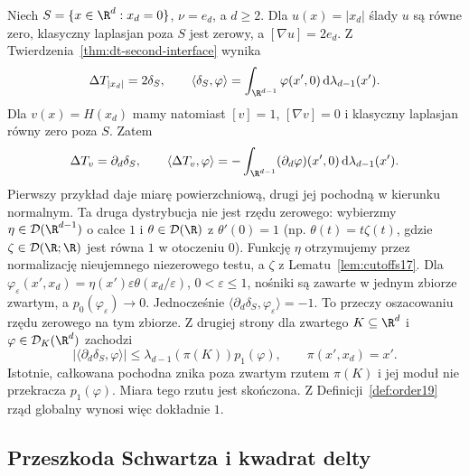 \begin{przyklad}
\label{ex:dt-flat-interface}
Niech $S=\{x\in\R^d:x_d=0\}$, $\nu=e_d$,
a $d\ge2$. Dla $u(x)=|x_d|$ ślady $u$ są równe zero,
klasyczny laplasjan poza $S$ jest zerowy, a
$[\nabla u]=2e_d$. Z Twierdzenia~\ref{thm:dt-second-interface}
wynika
\[
 \Delta T_{|x_d|}=2\delta_S,\qquad
 \langle\delta_S,\varphi\rangle
 =\int_{\R^{d-1}}\varphi(x',0)\,\mathrm d\lambda_{d-1}(x').
\]
Dla $v(x)=H(x_d)$ mamy natomiast $[v]=1$,
$[\nabla v]=0$ i klasyczny laplasjan równy zero poza $S$.
Zatem
\[
 \Delta T_v=\partial_d\delta_S,\qquad
 \langle\Delta T_v,\varphi\rangle
 =-\int_{\R^{d-1}}(\partial_d\varphi)(x',0)\,
 \mathrm d\lambda_{d-1}(x').
\]
Pierwszy przykład daje miarę powierzchniową, drugi
jej pochodną w kierunku normalnym. Ta druga dystrybucja
nie jest rzędu zerowego: wybierzmy
$\eta\in\mathcal D(\R^{d-1})$ o całce $1$ i
$\theta\in\mathcal D(\R)$ z $\theta'(0)=1$
(np. $\theta(t)=t\zeta(t)$, gdzie
$\zeta\in\mathcal D(\R;\R)$ jest równa $1$ w otoczeniu $0$).
Funkcję $\eta$ otrzymujemy przez normalizację nieujemnego
niezerowego testu, a $\zeta$ z Lematu~\ref{lem:cutoffs17}.
Dla $\varphi_\varepsilon(x',x_d)
=\eta(x')\varepsilon\theta(x_d/\varepsilon)$,
$0<\varepsilon\le1$, nośniki są zawarte w jednym
zbiorze zwartym, a $p_0(\varphi_\varepsilon)\to0$.
Jednocześnie
$\langle\partial_d\delta_S,\varphi_\varepsilon\rangle=-1$.
To przeczy oszacowaniu rzędu zerowego na tym zbiorze.
Z drugiej strony dla zwartego $K\subseteq\R^d$
i $\varphi\in\mathcal D_K(\R^d)$ zachodzi
\[
 |\langle\partial_d\delta_S,\varphi\rangle|
 \le\lambda_{d-1}(\pi(K))p_1(\varphi),
 \qquad \pi(x',x_d)=x'.
\]
Istotnie, całkowana pochodna znika poza zwartym
rzutem $\pi(K)$ i jej moduł nie przekracza $p_1(\varphi)$.
Miara tego rzutu jest skończona.
Z Definicji~\ref{def:order19} rząd globalny wynosi
więc dokładnie $1$.
\end{przyklad}

\subsection{Przeszkoda Schwartza i kwadrat delty}

